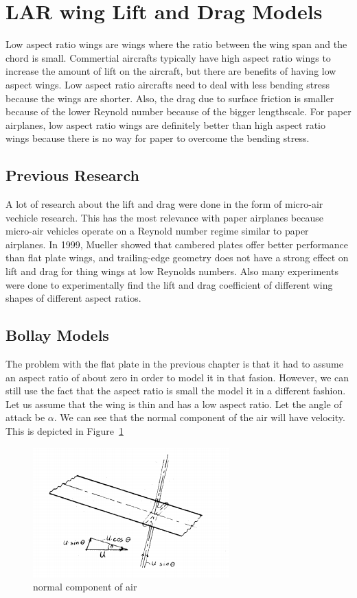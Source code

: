 
\section{LAR wing Lift and Drag Models}

Low aspect ratio wings are wings where the ratio between the wing span and
the chord is small. Commertial aircrafts typically have high aspect ratio wings
to increase the amount of lift on the aircraft, but there are benefits of having
low aspect wings. Low aspect ratio aircrafts need to deal with less bending
stress because the wings are shorter. Also, the drag due to surface friction is
smaller because of the lower Reynold number because of the bigger lengthscale.
For paper airplanes, low aspect ratio wings are definitely better than high
aspect ratio wings because there is no way for paper to overcome the
bending stress.


\subsection{Previous Research}

A lot of research about the lift and drag  were done in the form of
micro-air vechicle research. This has the most relevance with paper airplanes because
micro-air vehicles operate on a Reynold number regime similar to paper airplanes. 
In 1999, Mueller showed that cambered plates offer better performance than flat plate wings, and
trailing-edge geometry does not have a strong effect on lift and drag
for thing wings at low Reynolds numbers. Also many experiments were done to experimentally
find the lift and drag coefficient of different wing shapes of different aspect ratios.

\subsection{Bollay Models}

The problem with the flat plate in the previous chapter is that it had to assume 
an aspect ratio of about zero in order to model it in that fasion. However, we can still
use the fact that the aspect ratio is small the model it in a different fashion.
Let us assume that the wing is thin and has a low aspect ratio. Let the angle of attack
 be $\alpha$. We can see that the normal component of the air
will have velocity. This is depicted in Figure~\ref{fig:bollay1}

\begin{figure}[hl]
  \centering
    \includegraphics[scale=1]{figures/bollay1.png}
    \caption{normal component of air}
  \label{fig:bollay1}
\end{figure}


